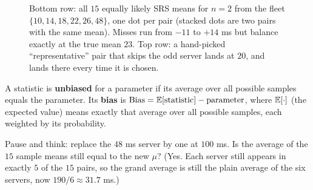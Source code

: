 \begin{figure}[H]
\centering
{}
\caption{Bottom row: all $15$ equally likely SRS means for $n=2$ from the fleet
$\{10,14,18,22,26,48\}$, one dot per pair (stacked dots are two pairs with the same
mean). Misses run from $-11$ to $+14$ ms but balance exactly at the true mean $23$. Top
row: a hand-picked ``representative'' pair that skips the odd server lands at $20$, and
lands there every time it is chosen.}
\label{fig:sampling-srs-means}
\end{figure}

\begin{definition}[Unbiased]
A statistic is \textbf{unbiased} for a parameter if its average over all possible samples
equals the parameter. Its \textbf{bias} is
$\operatorname{Bias} = \operatorname{\mathbb{E}}[\text{statistic}] - \text{parameter}$, where $\operatorname{\mathbb{E}}[\cdot]$ (the expected
value) means exactly that average over all possible samples, each weighted by its
probability.
\end{definition}

\begin{recoverybox}
Pause and think: replace the $48$ ms server by one at $100$ ms. Is the average of the $15$
sample means still equal to the new $\mu$? (Yes. Each server still appears in exactly
$5$ of the $15$ pairs, so the grand average is still the plain average of the six servers,
now $190/6 \approx 31.7$ ms.)
\end{recoverybox}


